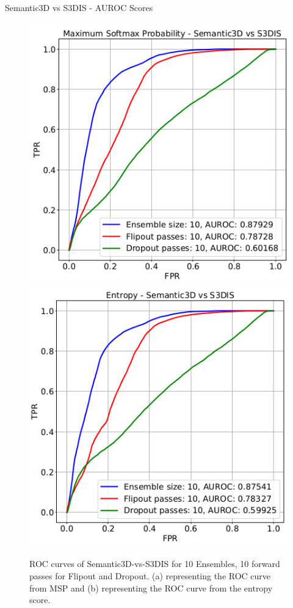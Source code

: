 \documentclass[aspectratio=169]{beamer}
\begin{document}
\begin{frame}{Semantic3D vs S3DIS - AUROC Scores}
    \begin{figure}
        \includegraphics[scale = 0.35]{images/ood1_msp_roc.jpg}
        \includegraphics[scale=0.35]{images/ood1_ent_roc.jpg}
        \caption{ROC curves of Semantic3D-vs-S3DIS for 10 Ensembles, 10 forward passes for Flipout and
        Dropout. (a) representing the ROC curve from MSP and (b) representing the ROC curve from the entropy
        score.}
    \end{figure}
\end{frame}
\end{document}
